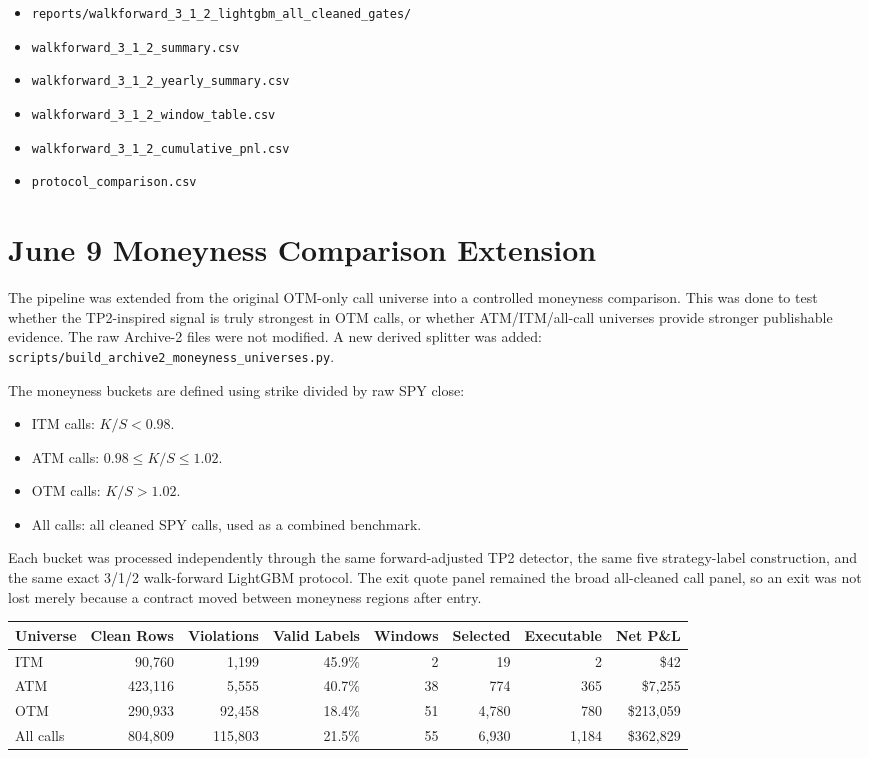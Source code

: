 \documentclass[11pt]{article}
\begin{document}
\begin{itemize}
  \item \texttt{reports/walkforward\_3\_1\_2\_lightgbm\_all\_cleaned\_gates/}
  \item \texttt{walkforward\_3\_1\_2\_summary.csv}
  \item \texttt{walkforward\_3\_1\_2\_yearly\_summary.csv}
  \item \texttt{walkforward\_3\_1\_2\_window\_table.csv}
  \item \texttt{walkforward\_3\_1\_2\_cumulative\_pnl.csv}
  \item \texttt{protocol\_comparison.csv}
\end{itemize}

\section*{June 9 Moneyness Comparison Extension}

The pipeline was extended from the original OTM-only call universe into a
controlled moneyness comparison. This was done to test whether the TP2-inspired
signal is truly strongest in OTM calls, or whether ATM/ITM/all-call universes
provide stronger publishable evidence. The raw Archive-2 files were not
modified. A new derived splitter was added:
\texttt{scripts/build\_archive2\_moneyness\_universes.py}.

The moneyness buckets are defined using strike divided by raw SPY close:

\begin{itemize}
  \item ITM calls: $K/S < 0.98$.
  \item ATM calls: $0.98 \leq K/S \leq 1.02$.
  \item OTM calls: $K/S > 1.02$.
  \item All calls: all cleaned SPY calls, used as a combined benchmark.
\end{itemize}

Each bucket was processed independently through the same forward-adjusted TP2
detector, the same five strategy-label construction, and the same exact 3/1/2
walk-forward LightGBM protocol. The exit quote panel remained the broad
all-cleaned call panel, so an exit was not lost merely because a contract moved
between moneyness regions after entry.

\begin{center}
\begin{tabular}{lrrrrrrr}
\toprule
Universe & Clean Rows & Violations & Valid Labels & Windows & Selected & Executable & Net P\&L \\
\midrule
ITM & 90,760 & 1,199 & 45.9\% & 2 & 19 & 2 & \$42 \\
ATM & 423,116 & 5,555 & 40.7\% & 38 & 774 & 365 & \$7,255 \\
OTM & 290,933 & 92,458 & 18.4\% & 51 & 4,780 & 780 & \$213,059 \\
All calls & 804,809 & 115,803 & 21.5\% & 55 & 6,930 & 1,184 & \$362,829 \\
\bottomrule
\end{tabular}
\end{center}
\end{document}
